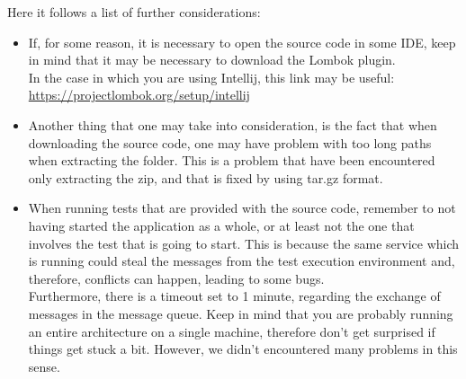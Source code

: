 \par 
Here it follows a list of further considerations: 
\begin{itemize}
\item If, for some reason, it is necessary to open the source code in some IDE, keep in mind that it
may be necessary to download the Lombok plugin. \\
In the case in which you are using Intellij, this link may be useful:\\
\url{https://projectlombok.org/setup/intellij}

\item Another thing that one may take into consideration, is the fact that when downloading the source code, one may have problem with too long
paths when extracting the folder. This is a problem that have been encountered only extracting the zip, and that is fixed
by using tar.gz format. 

\item When running tests that are provided with the source code, remember to not having started the application as a whole, or at least not
the one that involves the test that is going to start. This is because the same service which is running could steal the messages from the test execution environment and, therefore, conflicts can happen, leading to some bugs. \\
Furthermore, there is a timeout set to 1 minute, regarding the exchange of messages in the message queue. Keep in mind that you are probably
running an entire architecture on a single machine, therefore don't get surprised if things get stuck a bit. However, we didn't encountered
many problems in this sense.
\end{itemize}

